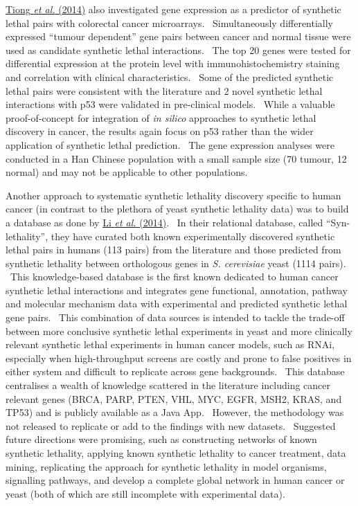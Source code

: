 \hyperlink{ENREF95}{Tiong}\hyperlink{ENREF95}{\textit{ et al.}}\hyperlink{ENREF95}{ (2014)} also investigated gene expression as a predictor of synthetic lethal pairs with colorectal cancer microarrays. \ Simultaneously differentially expressed {\textquotedblleft}tumour dependent{\textquotedblright} gene pairs between cancer and normal tissue were used as candidate synthetic lethal interactions. \ The top 20 genes were tested for differential expression at the protein level with immunohistochemistry staining and correlation with clinical characteristics. \ Some of the predicted synthetic lethal pairs were consistent with the literature and 2 novel synthetic lethal interactions with p53 were validated in pre-clinical models. \ While a valuable proof-of-concept for integration of \textit{in silico} approaches to synthetic lethal discovery in cancer, the results again focus on p53 rather than the wider application of synthetic lethal prediction. \ The gene expression analyses were conducted in a Han Chinese population with a small sample size (70 tumour, 12 normal) and may not be applicable to other populations. \  

Another approach to systematic synthetic lethality discovery specific to human cancer (in contrast to the plethora of yeast synthetic lethality data) was to build a database as done by \hyperlink{ENREF69}{Li}\hyperlink{ENREF69}{\textit{ et al.}}\hyperlink{ENREF69}{ (2014)}. \ In their relational database, called {\textquotedblleft}Syn-lethality{\textquotedblright}, they have curated both known experimentally discovered synthetic lethal pairs in humans (113 pairs) from the literature and those predicted from synthetic lethality between orthologous genes in \textit{S. cerevisiae} yeast (1114 pairs). \ This knowledge-based database is the first known dedicated to human cancer synthetic lethal interactions and integrates gene functional, annotation, pathway and molecular mechanism data with experimental and predicted synthetic lethal gene pairs. \ This combination of data sources is intended to tackle the trade-off between more conclusive synthetic lethal experiments in yeast and more clinically relevant synthetic lethal experiments in human cancer models, such as RNAi, especially when high-throughput screens are costly and prone to false positives in either system and difficult to replicate across gene backgrounds. \ This database centralises a wealth of knowledge scattered in the literature including cancer relevant genes (BRCA, PARP, PTEN, VHL, MYC, EGFR, MSH2, KRAS, and TP53) and is publicly available as a Java App. \ However, the methodology was not released to replicate or add to the findings with new datasets. \ Suggested future directions were promising, such as constructing networks of known synthetic lethality, applying known synthetic lethality to cancer treatment, data mining, replicating the approach for synthetic lethality in model organisms, signalling pathways, and develop a complete global network in human cancer or yeast (both of which are still incomplete with experimental data). \  


